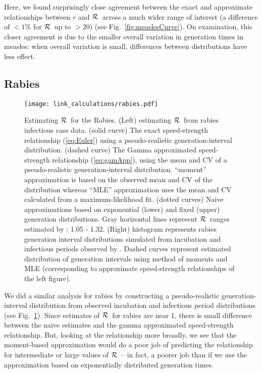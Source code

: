 \documentclass[12pt]{article}
\newcommand{\RR}{\ensuremath{{\cal R}}}
\newcommand{\eref}[1]{(\ref{eq:#1})}
\newcommand{\fref}[1]{Fig.~\ref{fig:#1}}
\begin{document}
Here, we found surprisingly close agreement between the exact and approximate relationships between $r$ and \RR\ across a much wider range of interest (a difference of $<1\%$ for \RR\ up to $>20$) (see \fref{measlesCurve}).
On examination, this closer agreement is due to the smaller overall variation in generation times in measles: when overall variation is small, differences between distributions have less effect.

\subsection{Rabies}
\label{Rabies_example}

\begin{figure}[htbp] \centering
	\texttt{[image: link\_calculations/rabies.pdf]}
	\caption{Estimating \RR~for the Rabies.
	    (Left) estimating \RR~from rabies infectious case data.
		(solid curve) The exact speed-strength relationship \eref{Euler} using a pseudo-realistic generation-interval distribution.
(dashed curve) The Gamma approximated speed-strength relationship \eref{gamApp}, using the mean and CV of a pseudo-realistic generation-interval distribution. 
        ``moment'' approximation is based on the observed mean and CV of the distribution whereas ``MLE'' approximation uses the mean and CV calculated from a maximum-likelihood fit.
		(dotted curves) Naive approximations based on exponential (lower) and fixed (upper) generation distributions.
		Gray horizontal lines represent \RR\ ranges estimated by \cite{HampDush09}: 1.05 - 1.32.
		(Right) histogram represents rabies generation interval distributions simulated from incubation and infectious periods observed by \cite{HampDush09}.
		Dashed curves represent estimated distribution of generation intervals using method of moments and MLE (corresponding to approximate speed-strength relationships of the left figure). 
	}
	\label{fig:rabiesCurve}
\end{figure}

We did a similar analysis for rabies by constructing a pseudo-realistic generation-interval distribution from observed incubation and infectious period distributions (see \fref{rabiesCurve}).
Since estimates of \RR\ for rabies are near 1, there is small difference between the naive estimates and the gamma approximated speed-strength relationship. 
But, looking at the relationship more broadly, we see that the moment-based approximation would do a poor job of predicting the relationship for intermediate or large values of \RR\ -- in fact, a poorer job than if we use the approximation based on exponentially distributed generation times. 
\end{document}
